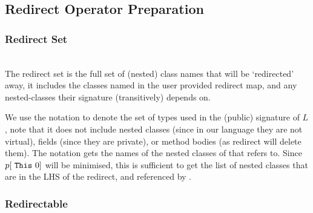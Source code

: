 \subsection{Redirect Operator Preparation}
\subsubsection{Redirect Set} \noindent\\ 
The redirect set is the full set of (nested) class names that will be `redirected' away, it includes the classes named in the user provided redirect map, and any nested-classes their signature (transitively) depends on.

\begin{defs}
	
\end{defs}

We use the notation  to denote the set of types used in the (public) signature of $L$, note that it does not include nested classes (since in our language they are not virtual),  fields (since they are private), or method bodies (as redirect will delete them). The notation  gets the names of the nested classes of  that \Tz refers to. Since $p[ \mbox{ {\texttt{This}} } {0}]$ will be minimised, this is sufficient to get the list of nested classes that are in the LHS of the redirect, and referenced by \Tz.


\subsubsection{Redirectable}
\noindent\\ 

